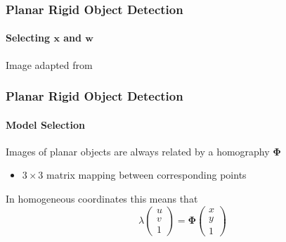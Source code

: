 \documentclass[xetex,professionalfont]{beamer}
\renewcommand{\vec}[1]{\ensuremath{\mathbf{#1}}}
\newcommand{\vw}{\vec{w}}
\newcommand{\vx}{\vec{x}}
\renewcommand\emph[1]{\textcolor{tuwcvl_inf_red}{#1}}
\begin{document}
\begin{frame}
\frametitle{Planar Rigid Object Detection}
\framesubtitle{Selecting $\vx$ and $\vw$}

\begin{center}
    {\centering Image adapted from \cite{prince12}}
\end{center}

\end{frame}


\begin{frame}
\frametitle{Planar Rigid Object Detection}
\framesubtitle{Model Selection}

Images of planar objects are always related by a \emph{homography} $\boldsymbol{\Phi}$
\begin{itemize}
	\item $3\times3$ matrix mapping between corresponding points
\end{itemize}

\bigskip
In homogeneous coordinates this means that
\[
	\lambda
	\begin{pmatrix}
		u \\ v \\ 1
	\end{pmatrix}
	= \boldsymbol{\Phi}
	\begin{pmatrix}
		x \\ y \\ 1
	\end{pmatrix}
\]

\end{frame}

\end{document}
